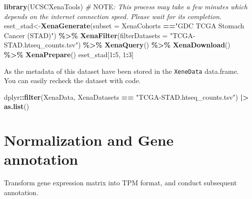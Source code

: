 \documentclass[
  12pt,
]{book}
\newenvironment{Shaded}{\begin{snugshade}}{\end{snugshade}}
\newcommand{\AlertTok}[1]{\textcolor[rgb]{0.94,0.16,0.16}{#1}}
\newcommand{\AttributeTok}[1]{\textcolor[rgb]{0.13,0.29,0.53}{#1}}
\newcommand{\CommentTok}[1]{\textcolor[rgb]{0.56,0.35,0.01}{\textit{#1}}}
\newcommand{\DecValTok}[1]{\textcolor[rgb]{0.00,0.00,0.81}{#1}}
\newcommand{\FunctionTok}[1]{\textcolor[rgb]{0.13,0.29,0.53}{\textbf{#1}}}
\newcommand{\NormalTok}[1]{#1}
\newcommand{\OtherTok}[1]{\textcolor[rgb]{0.56,0.35,0.01}{#1}}
\newcommand{\SpecialCharTok}[1]{\textcolor[rgb]{0.81,0.36,0.00}{\textbf{#1}}}
\newcommand{\StringTok}[1]{\textcolor[rgb]{0.31,0.60,0.02}{#1}}
\begin{document}
\begin{Shaded}
\begin{Highlighting}[]
\FunctionTok{library}\NormalTok{(UCSCXenaTools)}
\CommentTok{\# }\AlertTok{NOTE}\CommentTok{: This process may take a few minutes which depends on the internet connection speed. Please wait for its completion.}
\NormalTok{eset\_stad}\OtherTok{\textless{}{-}}\FunctionTok{XenaGenerate}\NormalTok{(}\AttributeTok{subset =}\NormalTok{ XenaCohorts }\SpecialCharTok{==}\StringTok{"GDC TCGA Stomach Cancer (STAD)"}\NormalTok{) }\SpecialCharTok{\%\textgreater{}\%} 
  \FunctionTok{XenaFilter}\NormalTok{(}\AttributeTok{filterDatasets    =} \StringTok{"TCGA{-}STAD.htseq\_counts.tsv"}\NormalTok{) }\SpecialCharTok{\%\textgreater{}\%} 
  \FunctionTok{XenaQuery}\NormalTok{() }\SpecialCharTok{\%\textgreater{}\%}
  \FunctionTok{XenaDownload}\NormalTok{() }\SpecialCharTok{\%\textgreater{}\%} 
  \FunctionTok{XenaPrepare}\NormalTok{()}
\NormalTok{eset\_stad[}\DecValTok{1}\SpecialCharTok{:}\DecValTok{5}\NormalTok{, }\DecValTok{1}\SpecialCharTok{:}\DecValTok{3}\NormalTok{]}
\end{Highlighting}
\end{Shaded}

As the metadata of this dataset have been stored in the \texttt{XeneData} data.frame. You can easily recheck the dataset with code.

\begin{Shaded}
\begin{Highlighting}[]
\NormalTok{dplyr}\SpecialCharTok{::}\FunctionTok{filter}\NormalTok{(XenaData, XenaDatasets }\SpecialCharTok{==} \StringTok{"TCGA{-}STAD.htseq\_counts.tsv"}\NormalTok{) }\SpecialCharTok{|\textgreater{}} 
  \FunctionTok{as.list}\NormalTok{()}
\end{Highlighting}
\end{Shaded}

\hypertarget{normalization-and-gene-annotation}{%
\section{Normalization and Gene annotation}\label{normalization-and-gene-annotation}}

Transform gene expression matrix into TPM format, and conduct subsequent annotation.
\end{document}

